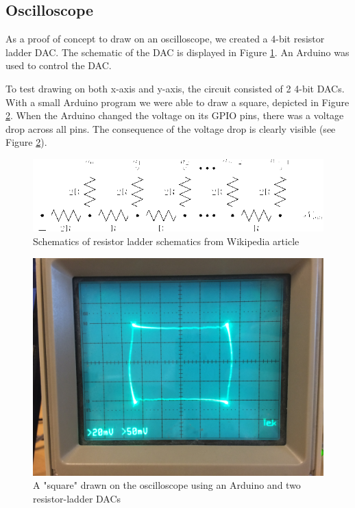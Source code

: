\subsection{Oscilloscope}
As a proof of concept to draw on an oscilloscope, we created a 4-bit resistor ladder DAC. The schematic of the DAC is displayed in Figure \ref{fig:r2r-ladder}.
An Arduino was used to control the DAC.

To test drawing on both x-axis and y-axis, the circuit consisted of 2 4-bit DACs.
With a small Arduino program we were able to draw a square, depicted in Figure \ref{fig:osc_poc}.
When the Arduino changed the voltage on its GPIO pins, there was a voltage drop across all pins.
The consequence of the voltage drop is clearly visible (see Figure \ref{fig:osc_poc}).


\begin{figure}[h]
\includegraphics[width=\columnwidth]{images/r2r-ladder}
\centering
\caption{Schematics of resistor ladder schematics from Wikipedia article \cite{r2r-ladder-schematics}}
\label{fig:r2r-ladder}
\end{figure}

\begin{figure}[h]
\includegraphics[width=\columnwidth]{images/osc_square_close}
\centering
\caption{A "square" drawn on the oscilloscope using an Arduino and two resistor-ladder DACs}
\label{fig:osc_poc}
\end{figure}
